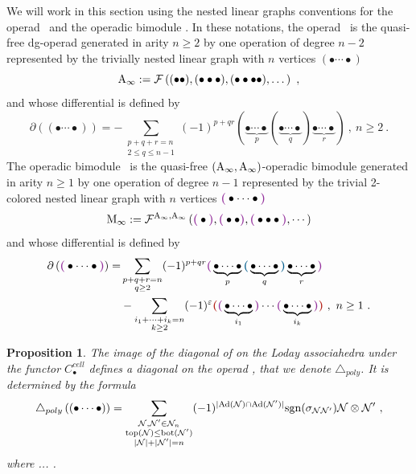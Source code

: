 \documentclass[twoside, 12pt]{amsart}
\newtheorem{proposition}[definition]{Proposition}
\theoremstyle{remark}
\begin{document}
We will work in this section using the nested linear graphs conventions for the operad \Ainf\ and the operadic bimodule \Minf . In these notations, the operad \Ainf\ is the quasi-free dg-operad generated in arity $n \geq 2$ by one operation of degree $n-2$ represented by the trivially nested linear graph with $n$ vertices $(\bullet \cdots \bullet )$ 
\[ \mathrm{A}_\infty := \mathcal{F} \left( ( \bullet \bullet ) , ( \bullet \bullet \bullet ) ,  ( \bullet \bullet \bullet \bullet ) , \dots  \right) \ , \]
and whose differential is defined by
\[ \partial \left( ( \bullet \cdots \bullet ) \right) = - \sum_{\substack{p+q+r=n \\ 2 \leq q \leq n-1}} (-1)^{p+qr}( \underbrace{\bullet \cdots \bullet}_p ( \underbrace{\bullet \cdots \bullet}_q ) \underbrace{\bullet \cdots \bullet}_r ) \ , \ n\geq 2 \ . \]
The operadic bimodule \Minf\ is the quasi-free $(\mathrm{A}_\infty , \mathrm{A}_\infty)$-operadic bimodule generated in arity $n \geq 1$ by one operation of degree $n-1$ represented by the trivial 2-colored nested linear graph with $n$ vertices $\purple{\bullet \cdots \bullet}$
\[ \Minf := \mathcal{F}^{\Ainf , \Ainf} \left( \purple{\bullet} , \purple{\bullet \bullet} , \purple{\bullet \bullet \bullet} , \cdots \right)\]
and whose differential is defined by
\begin{align*}
\partial \left( \purple{\bullet \cdots \bullet} \right) =& \sum_{\substack{p+q+r=n \\ q \geq 2}} (-1)^{p+qr} \purple{\underbrace{\bullet \cdots \bullet}_p \blue{\underbrace{\bullet \cdots \bullet}_q} \underbrace{\bullet \cdots \bullet}_r} \\
&-  \sum_{\substack{i_1+\cdots+i_k=n \\ k \geq 2}} (-1)^{\varepsilon} \red{\purple{\underbrace{\bullet \cdots \bullet}_{i_1}} \cdots \purple{\underbrace{\bullet \cdots \bullet}_{i_k}}} \ , \ n \geq 1 \ .
\end{align*} 


\begin{proposition}
\label{prop:diagonal-polytopale-a-infini}
The image of the diagonal of \cite{MTTV19} on the Loday associahedra under the functor $C_\bullet^{cell}$ defines a diagonal on the operad \Ainf , that we denote $\triangle_{poly}$. It is determined by the formula 
\[ \triangle_{poly} \left( (\bullet \cdots \bullet) \right) = 
\sum_{\substack{
  \mathcal{N},\mathcal{N}' \in \mathcal{N}_n \\ 
  \operatorname{top}(\mathcal{N}) \leq \operatorname{bot}(\mathcal{N'}) \\
  |\mathcal{N}|+|\mathcal{N}'|=n
}}
(-1)^{|\mathrm{Ad}(\mathcal{N})\cap \mathrm{Ad}(\mathcal{N}')|}\mathrm{sgn}(\sigma_{\mathcal{N}\mathcal{N}'})\mathcal{N} \otimes \mathcal{N}' \ , \] 
where ... . 
\end{proposition}
\end{document}
